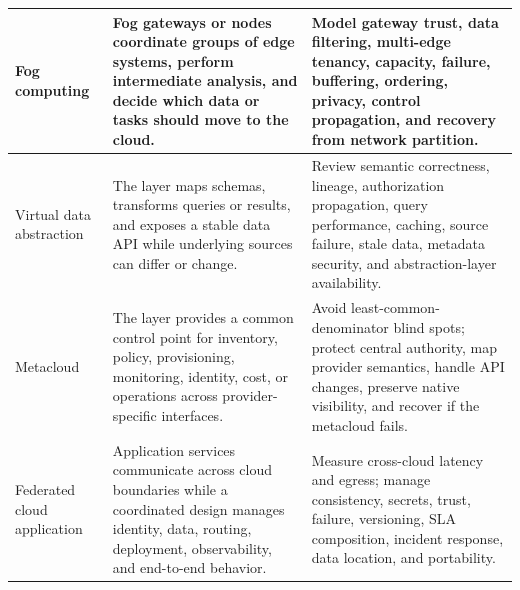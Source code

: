 \documentclass[11pt]{article}
\begin{document}
\begin{longtable}{@{}>{\RaggedRight\arraybackslash}p{}>{\RaggedRight\arraybackslash}p{}>{\RaggedRight\arraybackslash}p{}@{}}
Fog computing & Fog gateways or nodes coordinate groups of edge systems, perform intermediate analysis, and decide which data or tasks should move to the cloud. & Model gateway trust, data filtering, multi-edge tenancy, capacity, failure, buffering, ordering, privacy, control propagation, and recovery from network partition. \\\midrule
Virtual data abstraction & The layer maps schemas, transforms queries or results, and exposes a stable data API while underlying sources can differ or change. & Review semantic correctness, lineage, authorization propagation, query performance, caching, source failure, stale data, metadata security, and abstraction-layer availability. \\\midrule
Metacloud & The layer provides a common control point for inventory, policy, provisioning, monitoring, identity, cost, or operations across provider-specific interfaces. & Avoid least-common-denominator blind spots; protect central authority, map provider semantics, handle API changes, preserve native visibility, and recover if the metacloud fails. \\\midrule
Federated cloud application & Application services communicate across cloud boundaries while a coordinated design manages identity, data, routing, deployment, observability, and end-to-end behavior. & Measure cross-cloud latency and egress; manage consistency, secrets, trust, failure, versioning, SLA composition, incident response, data location, and portability. \\\midrule
\bottomrule
\end{longtable}
\endgroup
\end{document}
